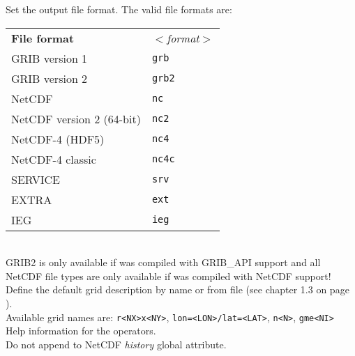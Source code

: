 \begin{tabbing}
         \> Set the output file format. The valid file formats are: \\
         \> \parbox[r]{3in}{
              \vspace*{1mm}
              \hspace*{0cm}\begin{tabular}{|l|l|}
              \hline
              \rowcolor{pcolor2}
              {\bf File format}          & \sl $<$format$>$ \\
               GRIB version 1            & {\tt grb}  \\
               GRIB version 2            & {\tt grb2} \\
               NetCDF                    & {\tt nc}   \\
               NetCDF version 2 (64-bit) & {\tt nc2}  \\
               NetCDF-4 (HDF5)           & {\tt nc4}  \\
               NetCDF-4 classic          & {\tt nc4c} \\
               SERVICE                   & {\tt srv}  \\
               EXTRA                     & {\tt ext}  \\
               IEG                       & {\tt ieg}  \\
              \hline
              \end{tabular}
              \vspace*{1mm}
            } \\
         \> GRIB2 is only available if {\CDO} was compiled with GRIB\_API support and all \\
         \> NetCDF file types are only available if {\CDO} was compiled with NetCDF support! \\
         \> Define the default grid description by name or from file (see chapter 1.3 on page \pageref{GRID_DESCRIPTION}). \\
         \> Available grid names are: {\tt r<NX>x<NY>}, {\tt lon=<LON>/lat=<LAT>}, {\tt n<N>}, {\tt gme<NI>} \\
         \> Help information for the operators. \\
         \> Do not append to NetCDF {\it history} global attribute. \\

\end{tabbing}
